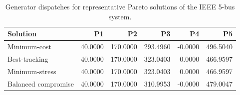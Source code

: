\begin{table}
\caption{Generator dispatches for representative Pareto solutions of the IEEE 5-bus system.}
\label{tab:dispatches}
\begin{tabular}{lrrrrr}
\toprule
Solution & P1 & P2 & P3 & P4 & P5 \\
\midrule
Minimum-cost & 40.0000 & 170.0000 & 293.4960 & -0.0000 & 496.5040 \\
Best-tracking & 40.0000 & 170.0000 & 323.0403 & 0.0000 & 466.9597 \\
Minimum-stress & 40.0000 & 170.0000 & 323.0403 & 0.0000 & 466.9597 \\
Balanced compromise & 40.0000 & 170.0000 & 310.9953 & -0.0000 & 479.0047 \\
\bottomrule
\end{tabular}
\end{table}

